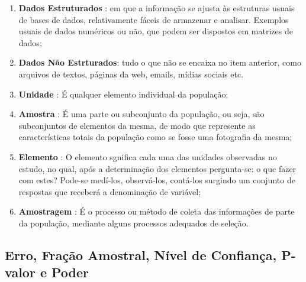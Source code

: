 \begin{enumerate}

\item \textbf{Dados Estruturados} : em que a informação se ajusta às estruturas
usuais de bases de dados, relativamente fáceis de armazenar e analisar.
Exemplos usuais de dados numéricos ou não, que podem ser dispostos
em matrizes de dados;

\item \textbf{Dados Não Estrturados}: tudo o que não se encaixa no item anterior, como arquivos de textos, páginas da web, emails, mídias sociais etc.

\item \textbf{Unidade} : É qualquer elemento individual da população;

\item \textbf{Amostra} : É uma parte ou subconjunto da população,
ou seja, são subconjuntos de elementos da mesma, de modo que
represente as características totais da população como se fosse
uma fotografia da mesma;

\item \textbf{Elemento} : O elemento sgnifica cada uma das
unidades observadas no estudo, no qual, após a determinação dos
elementos pergunta-se: o que fazer com estes? Pode-se medí-los,
observá-los, contá-los surgindo um conjunto de respostas que
receberá a denominação de variável;

 \item \textbf{Amostragem} : É o
processo ou método de coleta das informações de parte da
população, mediante alguns processos adequados de seleção.
\end{enumerate}

\subsection{Erro, Fração Amostral, Nível de Confiança, P-valor e Poder}


